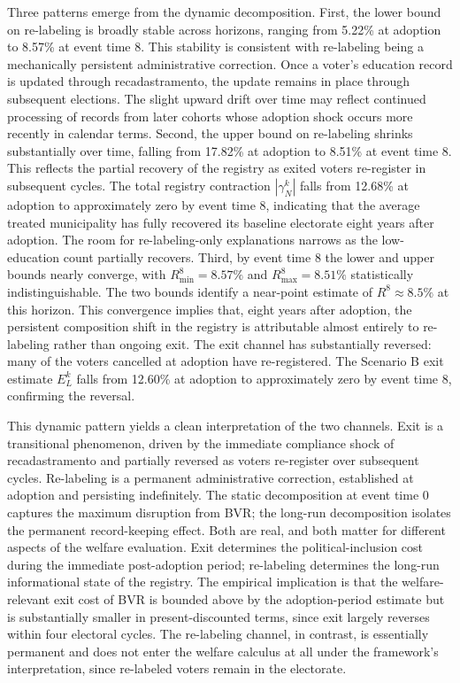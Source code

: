 Three patterns emerge from the dynamic decomposition. First, the lower bound on re-labeling is broadly stable across horizons, ranging from 5.22\% at adoption to 8.57\% at event time 8. This stability is consistent with re-labeling being a mechanically persistent administrative correction. Once a voter's education record is updated through recadastramento, the update remains in place through subsequent elections. The slight upward drift over time may reflect continued processing of records from later cohorts whose adoption shock occurs more recently in calendar terms. Second, the upper bound on re-labeling shrinks substantially over time, falling from 17.82\% at adoption to 8.51\% at event time 8. This reflects the partial recovery of the registry as exited voters re-register in subsequent cycles. The total registry contraction $|\gamma_N^k|$ falls from 12.68\% at adoption to approximately zero by event time 8, indicating that the average treated municipality has fully recovered its baseline electorate eight years after adoption. The room for re-labeling-only explanations narrows as the low-education count partially recovers. Third, by event time 8 the lower and upper bounds nearly converge, with $R_{\min}^8 = 8.57\%$ and $R_{\max}^8 = 8.51\%$ statistically indistinguishable. The two bounds identify a near-point estimate of $R^8 \approx 8.5\%$ at this horizon. This convergence implies that, eight years after adoption, the persistent composition shift in the registry is attributable almost entirely to re-labeling rather than ongoing exit. The exit channel has substantially reversed: many of the voters cancelled at adoption have re-registered. The Scenario B exit estimate $E_L^k$ falls from 12.60\% at adoption to approximately zero by event time 8, confirming the reversal.

This dynamic pattern yields a clean interpretation of the two channels. Exit is a transitional phenomenon, driven by the immediate compliance shock of recadastramento and partially reversed as voters re-register over subsequent cycles. Re-labeling is a permanent administrative correction, established at adoption and persisting indefinitely. The static decomposition at event time 0 captures the maximum disruption from BVR; the long-run decomposition isolates the permanent record-keeping effect. Both are real, and both matter for different aspects of the welfare evaluation. Exit determines the political-inclusion cost during the immediate post-adoption period; re-labeling determines the long-run informational state of the registry. The empirical implication is that the welfare-relevant exit cost of BVR is bounded above by the adoption-period estimate but is substantially smaller in present-discounted terms, since exit largely reverses within four electoral cycles. The re-labeling channel, in contrast, is essentially permanent and does not enter the welfare calculus at all under the framework's interpretation, since re-labeled voters remain in the electorate.

